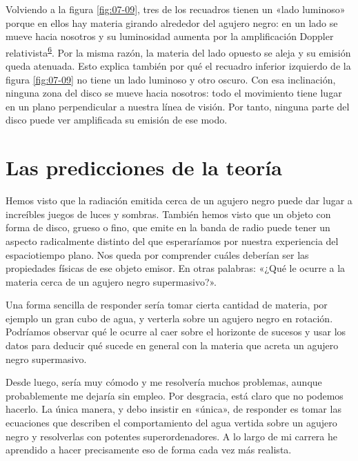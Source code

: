Volviendo a la figura \ref{fig:07-09}, tres de los recuadros tienen un «lado luminoso» porque en ellos hay materia girando alrededor del agujero negro: en un lado se mueve hacia nosotros y su luminosidad aumenta por la amplificación Doppler relativista\textsuperscript{\hyperlink{note:07-06}{6}}. Por la misma razón, la materia del lado opuesto se aleja y su emisión queda atenuada. Esto explica también por qué el recuadro inferior izquierdo de la figura \ref{fig:07-09} no tiene un lado luminoso y otro oscuro. Con esa inclinación, ninguna zona del disco se mueve hacia nosotros: todo el movimiento tiene lugar en un plano perpendicular a nuestra línea de visión. Por tanto, ninguna parte del disco puede ver amplificada su emisión de ese modo.

\section{Las predicciones de la teoría}\label{sec:07-theory}

Hemos visto que la radiación emitida cerca de un agujero negro puede dar lugar a increíbles juegos de luces y sombras. También hemos visto que un objeto con forma de disco, grueso o fino, que emite en la banda de radio puede tener un aspecto radicalmente distinto del que esperaríamos por nuestra experiencia del espaciotiempo plano. Nos queda por comprender cuáles deberían ser las propiedades físicas de ese objeto emisor. En otras palabras: «¿Qué le ocurre a la materia cerca de un agujero negro supermasivo?».

Una forma sencilla de responder sería tomar cierta cantidad de materia, por ejemplo un gran cubo de agua, y verterla sobre un agujero negro en rotación. Podríamos observar qué le ocurre al caer sobre el horizonte de sucesos y usar los datos para deducir qué sucede en general con la materia que acreta un agujero negro supermasivo.

Desde luego, sería muy cómodo y me resolvería muchos problemas, aunque probablemente me dejaría sin empleo. Por desgracia, está claro que no podemos hacerlo. La única manera, y debo insistir en «única», de responder es tomar las ecuaciones que describen el comportamiento del agua vertida sobre un agujero negro y resolverlas con potentes superordenadores. A lo largo de mi carrera he aprendido a hacer precisamente eso de forma cada vez más realista.

